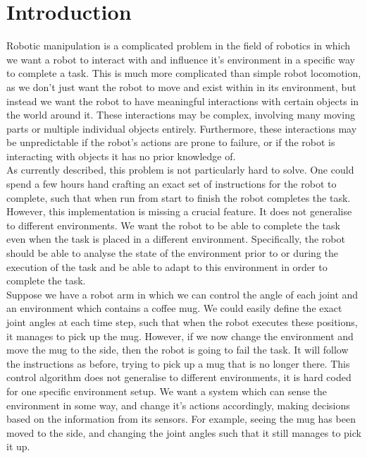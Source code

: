 \chapter{Introduction}
\label{chap:introduction}

Robotic manipulation is a complicated problem in the field of robotics in which we want a robot to interact with and influence it's environment in a specific way to complete a task. This is much more complicated than simple robot locomotion, as we don't just want the robot to move and exist within in its environment, but instead we want the robot to have meaningful interactions with certain objects in the world around it. These interactions may be complex, involving many moving parts or multiple individual objects entirely. Furthermore, these interactions may be unpredictable if the robot's actions are prone to failure, or if the robot is interacting with objects it has no prior knowledge of.\\

As currently described, this problem is not particularly hard to solve. One could spend a few hours hand crafting an exact set of instructions for the robot to complete, such that when run from start to finish the robot completes the task. However, this implementation is missing a crucial feature. It does not generalise to different environments. We want the robot to be able to complete the task even when the task is placed in a different environment. Specifically, the robot should be able to analyse the state of the environment prior to or during the execution of the task and be able to adapt to this environment in order to complete the task.\\

Suppose we have a robot arm in which we can control the angle of each joint and an environment which contains a coffee mug. We could easily define the exact joint angles at each time step, such that when the robot executes these positions, it manages to pick up the mug. However, if we now change the environment and move the mug to the side, then the robot is going to fail the task. It will follow the instructions as before, trying to pick up a mug that is no longer there. This control algorithm does not generalise to different environments, it is hard coded for one specific environment setup. We want a system which can sense the environment in some way, and change it's actions accordingly, making decisions based on the information from its sensors. For example, seeing the mug has been moved to the side, and changing the joint angles such that it still manages to pick it up.\\

